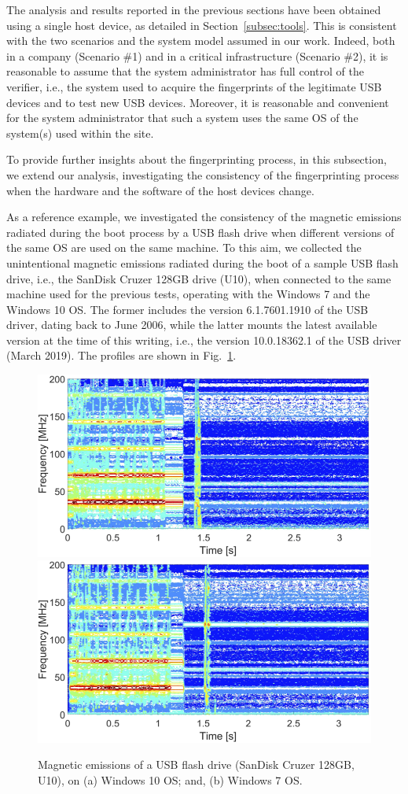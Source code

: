 \documentclass[acmsmall, authorversion]{acmart}
\begin{document}
The analysis and results reported in the previous sections have been obtained using a single host device, as detailed in Section~\ref{subsec:tools}.
This is consistent with the two scenarios and the system model assumed in our work. Indeed, both in a company (Scenario \#1) and in a critical infrastructure (Scenario \#2), it is reasonable to assume that the system administrator has full control of the verifier, i.e., the system used to acquire the fingerprints of the legitimate USB devices and to test new USB devices. Moreover, it is reasonable and convenient for the system administrator that such a system uses the same \acl{OS} of the system(s) used within the site.

To provide further insights about the fingerprinting process, in this subsection, we extend our analysis, investigating the consistency of the fingerprinting process when the hardware and the software of the host devices change.

As a reference example, we investigated the consistency of the magnetic emissions radiated during the boot process by a USB flash drive when different versions of the same OS are used on the same machine. To this aim, we collected the unintentional magnetic emissions radiated during the boot of a sample USB flash drive, i.e., the SanDisk Cruzer 128GB drive (U10), when connected to the same machine used for the previous tests, operating with the Windows 7 and the Windows 10 OS. The former includes the version 6.1.7601.1910 of the USB driver, dating back to June 2006, while the latter mounts the latest available version at the time of this writing, i.e., the version 10.0.18362.1 of the USB driver (March 2019). The profiles are shown in Fig.~\ref{fig:diff_os}.
\begin{figure}[htbp]
\centering
    \includegraphics[width=.45\columnwidth]{Figures/SA128W10.png}
    \includegraphics[width=.45\columnwidth]{Figures/SA128W7_002.png}
    \centering
    \caption{Magnetic emissions of a USB flash drive (SanDisk Cruzer 128GB, U10), on (a) Windows 10 OS; and, (b) Windows 7 OS.}
    \label{fig:diff_os}
\end{figure}
\end{document}
